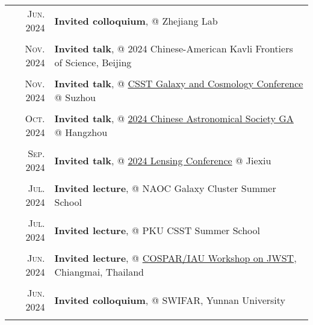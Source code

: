 \documentclass[letterpaper,10pt]{article}
\newcommand{\textwrap}{5.8in}       %
\begin{document}
\begingroup
\renewcommand\arraystretch{0.3}
\vspace*{-.5em}
\begin{longtable}{r|p{\textwrap}}

    \textsc{Jun. 2024}   &   \textbf{Invited colloquium}, @ Zhejiang Lab \\
    \multicolumn{2}{c}{} \\

    \textsc{Nov. 2024}   &   \textbf{Invited talk}, @ 2024 Chinese-American Kavli Frontiers of Science, Beijing \\
    \multicolumn{2}{c}{} \\

    \textsc{Nov. 2024}   &   \textbf{Invited talk}, @ \href{https://csstgc2024.casconf.cn/}{CSST Galaxy and Cosmology Conference} @ Suzhou \\
    \multicolumn{2}{c}{} \\

    \textsc{Oct. 2024}   &   \textbf{Invited talk}, @ \href{https://2024casmeeting.casconf.cn/}{2024 Chinese Astronomical Society GA} @ Hangzhou \\
    \multicolumn{2}{c}{} \\

    \textsc{Sep. 2024}   &   \textbf{Invited talk}, @ \href{https://cglensing2024.casconf.cn/}{2024 Lensing Conference} @ Jiexiu \\
    \multicolumn{2}{c}{} \\

    \textsc{Jul. 2024}   &   \textbf{Invited lecture}, @ NAOC Galaxy Cluster Summer School \\
    \multicolumn{2}{c}{} \\

    \textsc{Jul. 2024}   &   \textbf{Invited lecture}, @ PKU CSST Summer School \\
    \multicolumn{2}{c}{} \\

    \textsc{Jun. 2024}   &   \textbf{Invited lecture}, @ \href{https://cosparhq.cnes.fr/events/cospar-capacity-building-workshops/}{COSPAR/IAU Workshop on JWST}, Chiangmai, Thailand \\
    \multicolumn{2}{c}{} \\

    \textsc{Jun. 2024}   &   \textbf{Invited colloquium}, @ SWIFAR, Yunnan University \\
    \multicolumn{2}{c}{} \\


\end{longtable}
\end{document}

